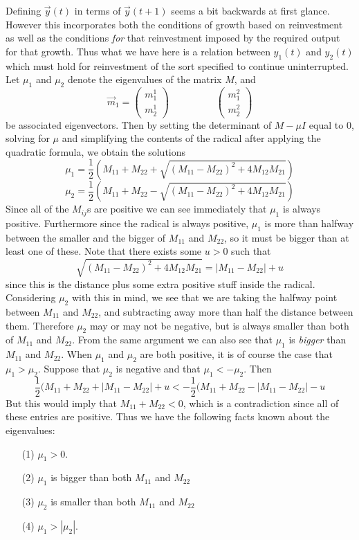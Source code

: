 \documentclass{article}
\theoremstyle{definition}
\theoremstyle{plain}
\theoremstyle{theorem}
\begin{document}
Defining $\vec{y}(t)$ in terms of $\vec{y}(t+1)$ seems a bit backwards at first glance. However this incorporates both the conditions of growth based on reinvestment as well as the conditions \emph{for} that reinvestment imposed by the required output for that growth. Thus what we have here is a relation between $y_1(t)$ and $y_2(t)$ which must hold for reinvestment of the sort specified to continue uninterrupted. Let $\mu_1$ and $\mu_2$ denote the eigenvalues of the matrix $M$, and 
\[ \vec{m}_1 = \begin{pmatrix} m^1_1 \\ m^1_2 \end{pmatrix}  \hspace{2cm} \begin{pmatrix} m^2_1 \\ m^2_2 \end{pmatrix} \]
be associated eigenvectors. Then by setting the determinant of $M-\mu I$ equal to $0$, solving for $\mu$ and simplifying the contents of the radical after applying the quadratic formula, we obtain the solutions
\[ \mu_1 =  \frac{1}{2}(M_{11}+M_{22}+\sqrt{(M_{11}-M_{22})^2 + 4M_{12}M_{21}}) \]
\[ \mu_2 =  \frac{1}{2}(M_{11}+M_{22}-\sqrt{(M_{11}-M_{22})^2 + 4M_{12}M_{21}}) \]
Since all of the $M_{ij}$s are positive we can see immediately that $\mu_1$ is always positive. Furthermore since the radical is always positive, $\mu_1$ is more than halfway between the smaller and the bigger of $M_{11}$ and $M_{22}$, so it must be bigger than at least one of these. Note that there exists some $u>0$ such that 
\[ \sqrt{(M_{11}-M_{22})^2 + 4M_{12}M_{21}} = |M_{11} - M_{22}| + u \]
since this is the distance plus some extra positive stuff inside the radical. Considering $\mu_2$ with this in mind, we see that we are taking the halfway point between $M_{11}$ and $M_{22}$, and subtracting away more than half the distance between them. Therefore $\mu_2$ may or may not be negative, but is always smaller than  both of $M_{11}$ and $M_{22}$. From the same argument we can also see that $\mu_1$ is \emph{bigger} than $M_{11}$ and $M_{22}$. When $\mu_1$ and $\mu_2$ are both positive, it is of course the case that $\mu_1 > \mu_2$. Suppose that $\mu_2$ is negative and that $\mu_1 < -\mu_2$. Then 
\[ \frac{1}{2}(M_{11}+M_{22}+|M_{11} - M_{22}| + u < -\frac{1}{2}(M_{11}+M_{22}-|M_{11} - M_{22}| - u \]
But this would imply that $M_{11} + M_{22} < 0$, which is a contradiction since all of these entries are positive. Thus we have the following facts known about the eigenvalues:
\begin{itemize}
	\item[(1)] $\mu_1 > 0$.
	\item[(2)] $\mu_1$ is bigger than both $M_{11}$ and $M_{22}$
	\item[(3)] $\mu_2$ is smaller than both $M_{11}$ and $M_{22}$
	\item[(4)] $\mu_1 > |\mu_2|$.
\end{itemize}
\end{document}
